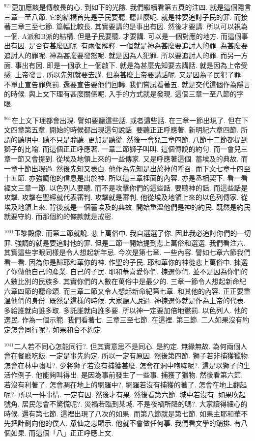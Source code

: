 \documentclass{book}
\begin{document}
$^{921}$更加應該是傳敬畏的心.
到如下的光陰.
我們繼續看第五頁的注四.
就是這個隱言三章一至八節.
它的結構首先是子民要聽.
聽甚麼呢.
就是神要追討子民的罪.
而接著三章三至七節.
篇幅比較長.
其實要講的是事出有因.
然後才要講.
所以可以視為一個.
A派和B派的結構.
但是子民要聽.
才要講.
可以是一個對應的地方.
而這個事出有因.
是否有甚麼因呢.
有兩個解釋.
一個就是神為甚麼要追討人的罪.
為甚麼要追討人的罪呢.
神為甚麼要發怒呢.
就是因為人犯罪.
所以要追討人的罪.
而另一方面.
事出有因.
即是一個承上一個啟下.
就是為甚麼先知要去講話.
就是因為上帝受感.
上帝發言.
所以先知就要去講.
但為甚麼上帝要講話呢.
又是因為子民犯了罪.
不單止宣告罪與罰.
還要宣告要他們回轉.
我們嘗試看著五.
就是交代這個作為隱言的時候.
與上文下理有甚麼關係呢.
入手的方式就是發現.
這個三章一至八節的字眼.

$^{961}$在上文下理都會出現.
譬如要聽這些話.
或者這些話.
在三章一節出現了.
但在下文四章第五章.
開始的時候都出現這句說話.
要聽正正呼應著.
新明紀六章四節.
所謂的聽明中.
聽不只是聆聽.
更加是聽從.
然後一會兒三章四節.
八節十二節都提到獅子的比喻.
而這個正正呼應著.
一章二節獅子叫叫.
這個傳說的約句.
而一會兒三章一節又會提到.
從埃及地領上來的一些傳家.
又是呼應著這個.
蓄埃及的典故.
而一章十節出現過.
然後先知又表白.
他作為先知是出於神的呼召.
而下文七章十四至十五節.
亦強調他的信息是出於神.
所以這三章裡面的內容.
亦是丞相契下.
看一看經文三章一節.
以色列人要聽.
而不是攻擊你們的這些話.
要聽神的話.
而這些話是攻擊.
攻擊在聖經就代表審判.
攻擊就是審判.
他從埃及地領上來的以色列傳家.
從埃及地領上來.
背後就是一個蓄埃及的典故.
開始重溫他們是神的約民.
既然是約民就要守約.
而那個約的條款就是戒密.

$^{1001}$玉黎殿像.
而第二節就說.
悲上萬俗中.
我自選選了你.
因此我必追討你們的一切罪.
強調的就是要追討他的罪.
但是二節一開始提到悲上萬俗和選選.
我們看注六.
其實這些字眼同樣是令人想起新年忌.
今次是第七章.
一些內容.
譬如七章六節我們看一看.
因為你是歸耶和華你的神.
作聖的子民.
耶和華你的神從悲上萬俗中.
揀選了你做他自己的產業.
自己的子民.
耶和華喜愛你們.
揀選你們.
並不是因為你們的人數比別的民族多.
其實你們的人數在萬俗中是最少的.
三章一節令人想起新命紀六章四節的聽命頌.
而三章二節又令人想起新命紀第七章.
和其他的內容.
正正要重溫他們的身份.
既然是這樣的時候.
大家聽人說過.
神揀選你就是作為上帝的代表.
多給誰就向誰多取.
多託誰就向誰多要.
所以神一定要加倍地懲罰.
以色列人.
他的選民.
作為一個示範.
我們看著七.
三章三至七節.
在這裡.
第三節.
二人如果沒有約定怎會同行呢?.
如果和合不約定.

$^{1041}$二人若不同心怎能同行?.
但其實意思不是同心.
是約定.
無緣無故.
為何兩個人會在餐廳吃飯.
一定是事先約定.
所以一定有原因.
然後第四節.
獅子若非捕獲獵物.
怎會在林中嘯叫?.
少將獅子若沒有捕獲甚麼.
怎會在洞中咆哮呢?.
這是以獅子的生活作例子.
他能夠叫得出.
是因為事前發生了一些事.
捕獲了獵物.
然後看第六節.
若沒有利著了.
怎會凋在地上的網羅中?.
網羅若沒有捕獲的著了.
怎會在地上翻起呢?.
所以一件事情.
一定有因.
然後才有果.
然後看第六節.
城中若沒有.
如果吹起號角.
居民怎會不驚慌呢?.
災禍若臨到某城.
不是夜禍所降的嗎?.
大家讀得細心的時候.
還有第七節.
這裡出現了八次的如果.
而第八節就是第七節.
如果主耶和華不先把計劃向他的僕人.
眾仙之志顯示.
他就不會做任何事.
我們看文學的鋪排.
有八個如果.
而這個「八」正正呼應上文.
\end{document}
